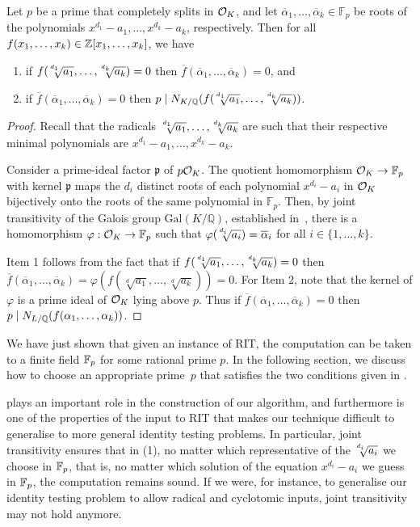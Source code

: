 \begin{lemma}\label{th:RIT-soundess}
Let $p$ be a prime that completely splits in $\mathcal{O}_K$, and
let $\overline{\alpha}_1,\ldots,\overline{\alpha}_k \in \mathbb{F}_p$
be roots of the polynomials $x^{d_1}-a_1,\ldots,x^{d_k}-a_k$, respectively.
Then for all 
 $f(x_1,\ldots,x_k)\in\mathbb{Z}[x_1,\ldots,x_k]$, we have
\begin{enumerate}
	\item if $f(\mysqrt{d_1}{a_1},\ldots,\mysqrt{d_k}{a_k}) = 0$ then $\overline{f}(\overline{\alpha}_1,\ldots,\overline{\alpha}_k) = 0$, and
	\item if $\overline{f}(\overline{\alpha}_1,\ldots,\overline{\alpha}_k) = 0$ then $p\mid N_{K/\QQ}(f(\mysqrt{d_1}{a_1},\ldots,\mysqrt{d_k}{a_k}))$.
\end{enumerate}
\end{lemma}
\begin{proof}
Recall that the radicals $\mysqrt{d_1}{a_1},\ldots, \mysqrt{d_k}{a_k}$ are such that their respective minimal polynomials are $x^{d_1}-a_1,\ldots,x^{d_k}-a_k$.

Consider a prime-ideal factor $\mathfrak{p}$ of $p\mathcal{O}_K$.
The quotient homomorphism $\mathcal{O}_K \rightarrow \mathbb{F}_p$
with kernel $\mathfrak{p}$ maps the $d_i$ distinct roots of 
each polynomial $x^{d_i}-a_i$ in $\mathcal{O}_K$ bijectively onto the 
roots of the same polynomial in $\mathbb{F}_p$.
Then, by joint transitivity of the Galois group $\mathrm{Gal}(K/\mathbb{Q})$, established in~, there is a homomorphism
$\varphi:\mathcal{O}_K\rightarrow \mathbb{F}_p$ such that 
$\varphi(\mysqrt{d_i}{a_i})=\overline{\alpha}_i$ for all $i \in \{1,\ldots,k\}$.

Item 1 follows from the fact that if $f(\mysqrt{d_1}{a_1},\ldots,\mysqrt{d_k}{a_k}) =0$
then $\overline{f}(\overline{\alpha}_1,\ldots,\overline{\alpha}_k)=\varphi(f(\sqrt[d]{a_1},\ldots,\sqrt[d]{a_k}))=0$.
For Item 2, note that
the kernel of $\varphi$ is a prime ideal of $\mathcal{O}_K$ lying above $p$.
Thus if $\overline{f}(\overline{\alpha}_1,\ldots,\overline{\alpha}_k)=0$
then $p\mid N_{L/\mathbb{Q}}(f(\alpha_1,\ldots,\alpha_k))$.
\end{proof}

We have just shown that given an instance of  RIT, the computation can be taken to a finite field $\mathbb{F}_p$ for some rational prime $p$. In the following section, we discuss how to choose an appropriate prime~$p$ that satisfies the two conditions given in .

 plays an important role in the construction of our algorithm, and furthermore is one of the properties of the input to  RIT  that makes our technique difficult to generalise to more general identity testing problems. In particular, joint transitivity ensures that in (1), no matter which representative of the $\mysqrt{d_i}{a_i}$ we choose in $\mathbb{F}_p$, that is, no matter which solution of the equation $x^{d_i}-a_i$ we guess in $\mathbb{F}_p$, the computation remains sound. If we were, for instance, to generalise our identity testing problem to allow radical and cyclotomic inputs, joint transitivity may not hold anymore.

